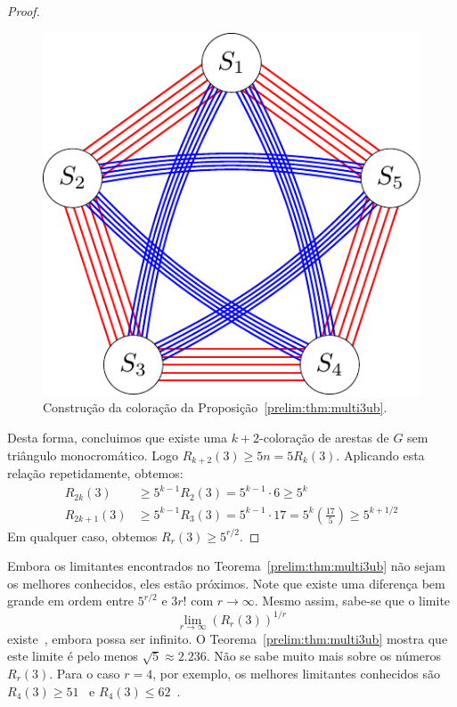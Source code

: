 \begin{proof}
\begin{figure}[ht!]
\centering
\includegraphics{figures/2_prelim_4_const}
\caption{Construção da coloração da Proposição~\ref{prelim:thm:multi3ub}.}
\label{prelim:fig:const}
\end{figure}

Desta forma, concluimos que existe uma $k+2$-coloração de arestas de $G$ sem triângulo monocromático. Logo $R_{k+2}(3) \geq 5n = 5R_k(3)$. Aplicando esta relação repetidamente, obtemos:
\begin{align*}
R_{2k}(3) &\geq 5^{k-1}R_2(3) = 5^{k-1}\cdot6 \geq 5^{k}  \\
R_{2k+1}(3) &\geq 5^{k-1}R_3(3) = 5^{k-1}\cdot17 = 5^k \left(\frac{17}{5}\right) \geq 5^{k + 1/2}
\end{align*}
Em qualquer caso, obtemos $R_{r}(3) \geq 5^{r/2}$.
\end{proof}

Embora os limitantes encontrados no Teorema~\ref{prelim:thm:multi3ub} não sejam os melhores conhecidos, eles estão próximos. Note que existe uma diferença bem grande em ordem entre $5^{r/2}$ e $3r!$ com $r \to \infty$. Mesmo assim, sabe-se que o  limite
\[ \lim_{r \to \infty} \left(R_r(3) \right)^{1/r} \]
existe~\cite{chung1983survey}, embora possa ser infinito. O Teorema~\ref{prelim:thm:multi3ub} mostra que este limite é pelo menos $\sqrt{5} \approx 2.236$.
Não se sabe muito mais sobre os números $R_r(3)$. Para o caso $r=4$, por exemplo, os melhores limitantes conhecidos são $R_4(3) \geq 51$~\cite{chung1973ramsey} e $R_4(3) \leq 62$~\cite{fettes2004upper}.



